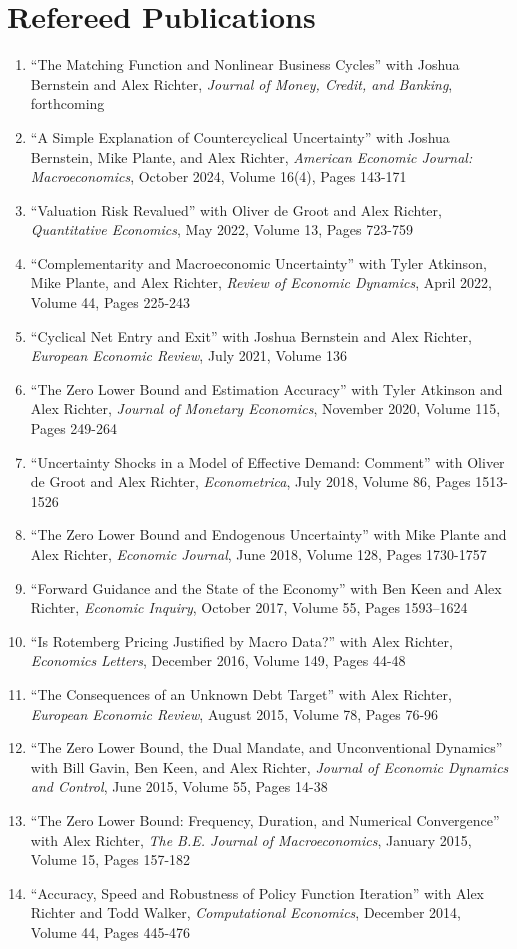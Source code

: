 \documentclass[10pt,letterpaper,en-US]{article}
\begin{document}
\section*{Refereed Publications}
\begin{enumerate}
\item ``The Matching Function and Nonlinear Business Cycles'' with Joshua Bernstein and Alex Richter, \emph{Journal of Money, Credit, and Banking}, forthcoming
\item ``A Simple Explanation of Countercyclical Uncertainty'' with Joshua Bernstein, Mike Plante, and Alex Richter, \emph{American Economic Journal: Macroeconomics}, October 2024, Volume 16(4), Pages 143-171
\item ``Valuation Risk Revalued'' with Oliver de Groot and Alex Richter, \emph{Quantitative Economics}, May 2022, Volume 13, Pages 723-759
\item ``Complementarity and Macroeconomic Uncertainty'' with Tyler Atkinson, Mike Plante, and Alex Richter, \emph{Review of Economic Dynamics}, April 2022, Volume 44, Pages 225-243
\item ``Cyclical Net Entry and Exit'' with Joshua Bernstein and Alex Richter, \emph{European Economic Review}, July 2021, Volume 136
\item ``The Zero Lower Bound and Estimation Accuracy'' with Tyler Atkinson and Alex Richter, \emph{Journal of Monetary Economics}, November 2020, Volume 115, Pages 249-264
\item ``Uncertainty Shocks in a Model of Effective Demand: Comment'' with Oliver de Groot and Alex Richter, \emph{Econometrica}, July 2018, Volume 86, Pages 1513-1526
\item ``The Zero Lower Bound and Endogenous Uncertainty'' with Mike Plante and Alex Richter, \emph{Economic Journal}, June 2018, Volume 128, Pages 1730-1757
\item ``Forward Guidance and the State of the Economy'' with Ben Keen and Alex Richter, \emph{Economic Inquiry}, October 2017, Volume 55, Pages 1593–1624
\item ``Is Rotemberg Pricing Justified by Macro Data?'' with Alex Richter, \emph{Economics Letters}, December 2016, Volume 149, Pages 44-48
\item ``The Consequences of an Unknown Debt Target'' with Alex Richter, \emph{European Economic Review}, August 2015, Volume 78, Pages 76-96
\item ``The Zero Lower Bound, the Dual Mandate, and Unconventional Dynamics'' with Bill Gavin, Ben Keen, and Alex Richter, \emph{Journal of Economic Dynamics and Control}, June 2015, Volume 55, Pages 14-38
\item ``The Zero Lower Bound: Frequency, Duration, and Numerical Convergence'' with Alex Richter, \emph{The B.E. Journal of Macroeconomics}, January 2015, Volume 15, Pages 157-182
\item ``Accuracy, Speed and Robustness of Policy Function Iteration'' with Alex Richter and Todd Walker, \emph{Computational Economics}, December 2014, Volume 44, Pages 445-476
\end{enumerate}
\end{document}

